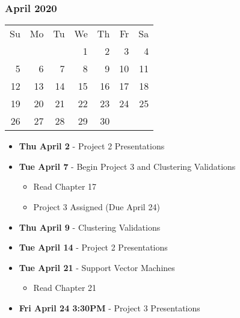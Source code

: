 \subsubsection*{April 2020}
\begin{tabular}{rrrrrrr}
Su & Mo & Tu & We & Th & Fr & Sa\\ \cline{5-5}
   &    &    &  1 &  \multicolumn{1}{|r|}{2} &  3 &  4\\ \cline{5-5}
 5 &  6 &  7 &  8 &  9 & 10 & 11\\
12 & 13 & 14 & 15 & 16 & 17 & 18\\
19 & 20 & 21 & 22 & 23 & 24 & 25\\ 
26 & 27 & 28 & 29 & 30 &    &\\ 
\end{tabular}
\begin{itemize}
\item\textbf{Thu April  2} - Project 2 Presentations
\item\textbf{Tue April  7} - Begin Project 3 and Clustering
Validations
    \begin{itemize}
        \item Read Chapter 17
        \item Project 3 Assigned (Due April 24)
    \end{itemize}
\item\textbf{Thu April  9} - Clustering Validations
\item\textbf{Tue April 14} - Project 2 Presentations
\item\textbf{Tue April 21} - Support Vector Machines
    \begin{itemize}
        \item Read Chapter 21
    \end{itemize}
\item\textbf{Fri April 24 3:30PM} - Project 3 Presentations
\end{itemize}
\hrulefill
